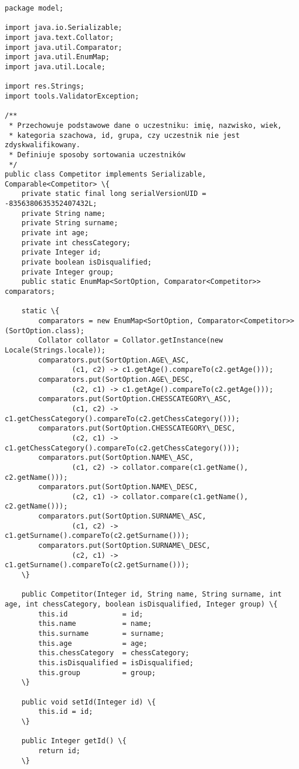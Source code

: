 \begin{verbatim}
package model;

import java.io.Serializable;
import java.text.Collator;
import java.util.Comparator;
import java.util.EnumMap;
import java.util.Locale;

import res.Strings;
import tools.ValidatorException;

/**
 * Przechowuje podstawowe dane o uczestniku: imię, nazwisko, wiek, 
 * kategoria szachowa, id, grupa, czy uczestnik nie jest zdyskwalifikowany. 
 * Definiuje sposoby sortowania uczestników
 */
public class Competitor implements Serializable, Comparable<Competitor> \{
	private static final long serialVersionUID = -8356380635352407432L;
	private String name;
    private String surname;
    private int age;
    private int chessCategory;
    private Integer id;
    private boolean isDisqualified;
    private Integer group;
    public static EnumMap<SortOption, Comparator<Competitor>> comparators;

    static \{
    	comparators = new EnumMap<SortOption, Comparator<Competitor>>(SortOption.class);
    	Collator collator = Collator.getInstance(new Locale(Strings.locale));
	    comparators.put(SortOption.AGE\_ASC, 
	    		(c1, c2) -> c1.getAge().compareTo(c2.getAge()));
		comparators.put(SortOption.AGE\_DESC, 
				(c2, c1) -> c1.getAge().compareTo(c2.getAge()));
		comparators.put(SortOption.CHESSCATEGORY\_ASC, 
				(c1, c2) -> c1.getChessCategory().compareTo(c2.getChessCategory()));
		comparators.put(SortOption.CHESSCATEGORY\_DESC, 
				(c2, c1) -> c1.getChessCategory().compareTo(c2.getChessCategory()));
		comparators.put(SortOption.NAME\_ASC, 
				(c1, c2) -> collator.compare(c1.getName(), c2.getName()));
		comparators.put(SortOption.NAME\_DESC, 
				(c2, c1) -> collator.compare(c1.getName(), c2.getName()));
		comparators.put(SortOption.SURNAME\_ASC, 
				(c1, c2) -> c1.getSurname().compareTo(c2.getSurname()));
		comparators.put(SortOption.SURNAME\_DESC, 
				(c2, c1) -> c1.getSurname().compareTo(c2.getSurname()));
    \}
    
    public Competitor(Integer id, String name, String surname, int age, int chessCategory, boolean isDisqualified, Integer group) \{
    	this.id 			= id;
        this.name 			= name;
        this.surname 		= surname;
        this.age 			= age;
        this.chessCategory 	= chessCategory;
        this.isDisqualified = isDisqualified;
        this.group			= group;
    \}
    
    public void setId(Integer id) \{
    	this.id = id;
    \}
    
    public Integer getId() \{
        return id;
    \}


\end{verbatim}
